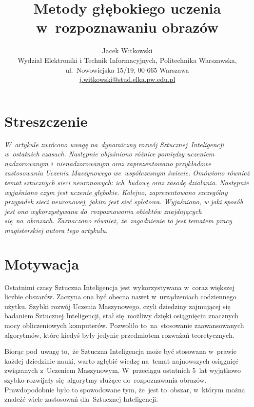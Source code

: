 \documentclass[oneside, 11pt, a4paper]{article}
\title{\fontsize{14pt}{10pt}\selectfont\textbf{Metody głębokiego uczenia w~rozpoznawaniu obrazów}} %
\author{
{\fontsize{12pt}{1.2em}\selectfont Jacek Witkowski} \\
{\fontsize{11pt}{1.2em}\selectfont Wydział Elektroniki i Technik Informacyjnych, Politechnika Warszawska,}\\
{\fontsize{11pt}{1.2em}\selectfont ul.~Nowowiejska 15/19, 00-665 Warszawa}\\
{\fontsize{11pt}{1.2em}\selectfont \href{mailto:j.witkowski@stud.elka.pw.edu.pl}{j.witkowski@stud.elka.pw.edu.pl}} 
\date{}
}
\begin{document}
\maketitle %


\begin{multicols}{2} %

\section*{Streszczenie}

\textit{
W~artykule zwrócono uwagę na~dynamiczny rozwój Sztucznej~Inteligencji w~ostatnich czasach. Następnie objaśniono różnice pomiędzy uczeniem nadzorowanym i~nienadzorowanym oraz zaprezentowano przykładowe zastosowania Uczenia Maszynowego we~współczesnym świecie. Omówiono również temat sztucznych sieci neuronowych: ich~budowę oraz zasadę działania. Następnie wyjaśniono czym jest uczenie głębokie. Kolejno, zaprezentowano szczególny przypadek sieci neuronowej, jakim jest sieć splotowa. Wyjaśniono, w jaki sposób jest ona wykorzystywana do~rozpoznawania obiektów znajdujących się~na~obrazach. Zaznaczono również, że~zagadnienie to jest tematem pracy magisterskiej autora tego artykułu.
}

\section{Motywacja}
Ostatnimi czasy Sztuczna Inteligencja jest wykorzystywana w~coraz większej liczbie obszarów. Zaczyna ona być obecna nawet w~urządzeniach codziennego użytku. Szybki rozwój Uczenia Maszynowego, czyli dziedziny zajmującej się badaniem Sztucznej Inteligencji, stał się~możliwy dzięki osiągnięciu znacznych mocy obliczeniowych komputerów. Pozwoliło to~na~stosowanie zaawansowanych algorytmów, które kiedyś były jedynie przedmiotem rozważań teoretycznych.

Biorąc pod~uwagę to,~że Sztuczna Inteligencja może być stosowana w~prawie każdej dziedzinie nauki, warto zgłębić wiedzę na~temat najnowszych osiągnięć związanych z~Uczeniem Maszynowym. W~przeciągu ostatnich 5~lat wyjątkowo szybko rozwijały się~algorytmy służące do~rozpoznawania obrazów. Prawdopodobnie było to spowodowane tym, że~jest to~obszar, w~którym można znaleźć wiele zastosowań dla~Sztucznej Inteligencji.


\end{multicols}
\end{document}
